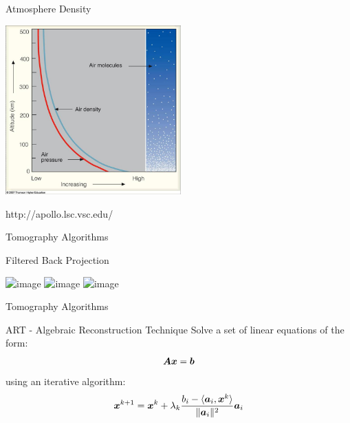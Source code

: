 \documentclass[compress,red,12pt]{beamer}
\begin{document}
\begin{frame}[label=air-density]{Atmosphere Density}
  \begin{center}
    \includegraphics[height=6.5cm]{images/vert_dist.jpg}
  \end{center}    
  \begin{flushright}
    {\tiny http://apollo.lsc.vsc.edu/}  \hyperlink{settings<4>}{}
  \end{flushright}
\end{frame}


\begin{frame}[label=tomo-algo]{Tomography Algorithms}
  \begin{block}{Filtered Back Projection}
  \end{block}

  \begin{center}
    \includegraphics<1>[height=6.5cm]{images/radon.jpg}
    \includegraphics<2>[height=6.5cm]{images/radon_inv.jpg}
    \includegraphics<3>[height=6.5cm]{images/radon_inv_filt.jpg}
  \end{center}
\end{frame}


\begin{frame}{Tomography Algorithms}
  \begin{block}{ART - Algebraic Reconstruction Technique}
    Solve a set of linear equations of the form: \\
    \begin{equation*}
      \bm{A} \bm{x} = \bm{b}
    \end{equation*}
    using an iterative algorithm: \\
    \begin{equation*}
      \bm{x}^{k+1} = \bm{x}^{k} + \lambda_k \frac{b_{i} - \langle \bm{a}_{i}, \bm{x}^{k} \rangle}{\lVert \bm{a}_{i} \rVert^2} \bm{a}_{i}
    \end{equation*}
  \end{block}
\end{frame}
\end{document}
